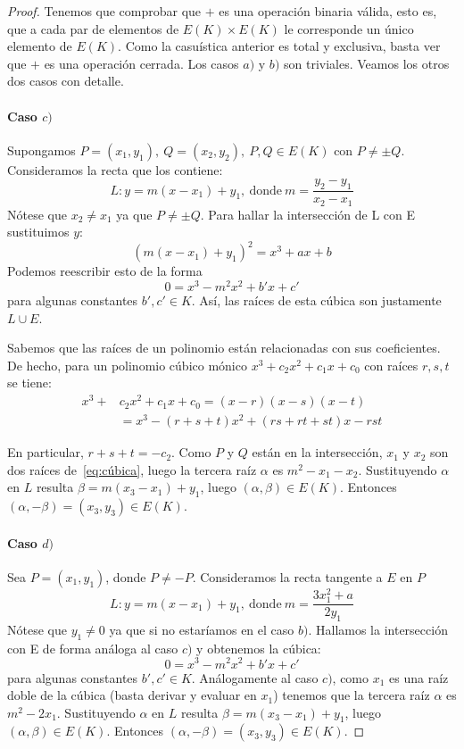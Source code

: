 \begin{proof}
Tenemos que comprobar que $+$ es una operación binaria válida, esto es, que a cada par de elementos de $E(K) \times E(K)$ le corresponde un único elemento de $E(K)$. Como la casuística anterior es total y exclusiva, basta ver que $+$ es una operación cerrada. Los casos $a)$ y $b)$ son triviales. Veamos los otros dos casos con detalle.

\paragraph{Caso $c)$}
Supongamos $P = (x_1, y_1),\ Q = (x_2, y_2),\ P, Q \in E(K)$ con $P \neq \pm Q$. Consideramos la recta que los contiene:
$$
	L: y = m(x - x_1) + y_1,\ \text{donde}\ m = \frac{y_2 - y_1}{x_2 - x_1}
$$
Nótese que $x_2 \neq x_1$ ya que $P \neq \pm Q$. Para hallar la intersección de L con E sustituimos $y$:
$$
	(m(x - x_1) + y_1)^2 = x^3 + a x + b
$$
Podemos reescribir esto de la forma
\begin{equation}
\label{eq:cúbica}
	0 = x^3 - m^2 x^2 + b' x + c'
\end{equation}
para algunas constantes $b', c' \in K$. Así, las raíces de esta cúbica son justamente $L \cup E$.

Sabemos que las raíces de un polinomio están relacionadas con sus coeficientes. De hecho, para un polinomio cúbico mónico $x^3 + c_2 x^2 + c_1 x + c_0$ con raíces $r, s, t$ se tiene:
\begin{align*}
	x^3 + &c_2 x^2 + c_1 x + c_0 = (x-r)(x-s)(x-t) \\
	&= x^3 - (r + s + t)x^2 + (r s + r t + s t)x - r s t
\end{align*}

En particular, $r + s + t = -c_2$. Como $P$ y $Q$ están en la intersección, $x_1$ y $x_2$ son dos raíces de~\eqref{eq:cúbica}, luego la tercera raíz $\alpha$ es $m^2 - x_1 - x_2$. Sustituyendo $\alpha$ en $L$ resulta $\beta = m(x_3 - x_1) + y_1$, luego $(\alpha, \beta) \in E(K)$. Entonces  $(\alpha, -\beta) = (x_3, y_3) \in E(K)$.

\paragraph{Caso $d)$}
Sea $P = (x_1, y_1)$, donde $P \neq -P$. Consideramos la recta tangente a $E$ en $P$
$$
	L: y = m(x - x_1) + y_1,\ \text{donde}\ m = \frac{3 x_1^2 + a}{2 y_1}
$$
Nótese que $y_1 \neq 0$ ya que si no estaríamos en el caso $b)$. Hallamos la intersección con E de forma análoga al caso $c)$ y obtenemos la cúbica:
$$
	0 = x^3 - m^2 x^2 + b' x + c'
$$
para algunas constantes $b', c' \in K$. Análogamente al caso $c)$, como $x_1$ es una raíz doble de la cúbica (basta derivar y evaluar en $x_1$) tenemos que la tercera raíz $\alpha$ es $m^2 - 2 x_1$. Sustituyendo $\alpha$ en $L$ resulta $\beta = m(x_3 - x_1) + y_1$, luego $(\alpha, \beta) \in E(K)$. Entonces  $(\alpha, -\beta) = (x_3, y_3) \in E(K)$.
\end{proof}

